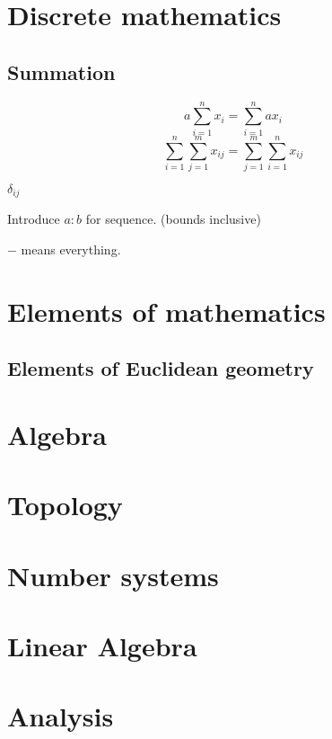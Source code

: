 \documentclass{report}
\begin{document}
\part{Discrete mathematics}
\setcounter{chapter}{0} %
\chapter{Summation}
\[ a\sum_{i=1}^n x_i = \sum_{i=1}^n ax_i \]
\[ \sum_{i=1}^n\sum_{j=1}^m x_{ij} = \sum_{j=1}^m\sum_{i=1}^n x_{ij} \]

$\delta_{ij}$

Introduce $a:b$ for sequence. (bounds inclusive)

$-$ means everything.




\part{Elements of mathematics}
\setcounter{chapter}{0} %
\chapter{Elements of Euclidean geometry}


\part{Algebra}
\setcounter{chapter}{0} %


\part{Topology}
\setcounter{chapter}{0} %


\part{Number systems}
\setcounter{chapter}{0} %


\part{Linear Algebra}
\setcounter{chapter}{0} %


\part{Analysis}
\setcounter{chapter}{0} %

\end{document}
